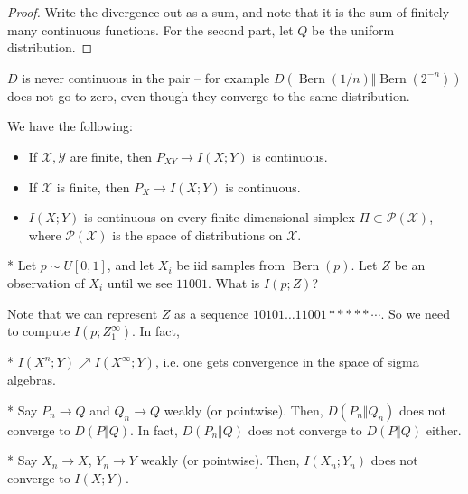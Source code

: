 \begin{proof}
	Write the divergence out as a sum, and note that it is the sum of finitely many continuous functions.
	For the second part, let $Q$ be the uniform distribution.
\end{proof}

\begin{exm}
	$D$ is never continuous in the pair -- for example $D(\operatorname{Bern}(1/n)\Vert \operatorname{Bern}(2^{-n}))$ does not go to zero, even though they converge to the same distribution.
\end{exm}

\begin{fact}
	We have the following:
	\begin{itemize}
		\item If $\mathcal X, \mathcal Y$ are finite, then $P_{XY} \to I(X;Y)$ is continuous.
		\item If $\mathcal X$ is finite, then $P_X\to I(X;Y)$ is continuous.
		\item $I(X;Y)$ is continuous on every finite dimensional simplex $\Pi\subset \mathcal P(\mathcal X)$, where $\mathcal P(\mathcal X)$ is the space of distributions on $\mathcal X$.
	\end{itemize}
\end{fact}

\begin{que}*
	Let $p\sim U[0,1]$, and let $X_i$ be iid samples from $\operatorname{Bern}(p)$. Let $Z$ be an observation of $X_i$ until we see $11001$. What is $I(p;Z)$?
\end{que}

Note that we can represent $Z$ as a sequence $10101\ldots 11001*****\cdots$. So we need to compute $I(p;Z_1^\infty)$. In fact, 

\begin{fact}*
	$I(X^n;Y) \nearrow I(X^\infty;Y)$,
	i.e. one gets convergence in the space of sigma algebras.
\end{fact}

\begin{fact}*
	Say $P_n\to Q$ and $Q_n\to Q$ weakly (or pointwise). 
	Then, $D(P_n\Vert Q_n)$ does not converge to $D(P\Vert Q)$. In fact, $D(P_n\Vert Q)$ does not converge to $D(P\Vert Q)$ either.
\end{fact}

\begin{fact}*
	Say $X_n \to X$, $Y_n\to Y$ weakly (or pointwise).
	Then, $I(X_n;Y_n)$ does not converge to $I(X;Y)$. 
\end{fact}

